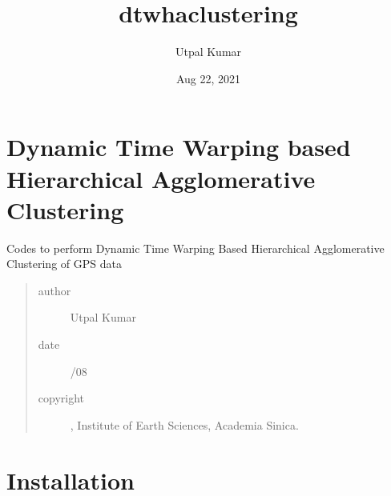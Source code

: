 \documentclass[letterpaper,10pt,english]{sphinxmanual}
\title{dtwhaclustering}
\date{Aug 22, 2021}
\author{Utpal Kumar}
\begin{document}
\pagestyle{empty}
\sphinxmaketitle
\pagestyle{plain}
\sphinxtableofcontents
\pagestyle{normal}
\label{\detokenize{index::doc}}

\label{\detokenize{usage/module_contents:module-dtwhaclustering}}

\chapter{Dynamic Time Warping based Hierarchical Agglomerative Clustering}
\label{\detokenize{usage/module_contents:dynamic-time-warping-based-hierarchical-agglomerative-clustering}}\label{\detokenize{usage/module_contents::doc}}
\sphinxAtStartPar
Codes to perform Dynamic Time Warping Based Hierarchical Agglomerative Clustering of GPS data
\begin{quote}\begin{description}
\item[{author}] \leavevmode
\sphinxAtStartPar
Utpal Kumar

\item[{date}] \leavevmode
{}/08

\item[{copyright}] \leavevmode
{}, Institute of Earth Sciences, Academia Sinica.

\end{description}\end{quote}


\chapter{Installation}
\label{\detokenize{usage/install:installation}}\label{\detokenize{usage/install::doc}}
\end{document}
